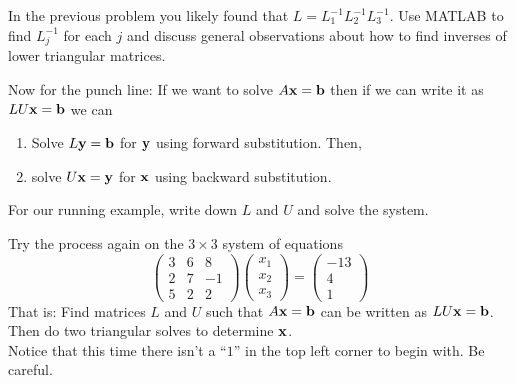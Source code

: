\begin{problem}
    In the previous problem you likely found that $L = L_1^{-1} L_2^{-1} L_3^{-1}$.  Use
    MATLAB to find $L_j^{-1}$ for each $j$ and discuss general observations about how to
    find inverses of lower triangular matrices.  
\end{problem}

\begin{problem}
    Now for the punch line: If we want to solve $A {\bf x} = {\bf b}$ then if we can write it as $LU
    {\bf x} = {\bf b}$ we can
    \begin{enumerate}
        \item Solve $L {\bf y} = {\bf b}$ for ${\bf y}$ using forward substitution.  Then,
        \item solve $U {\bf x} = {\bf y}$ for ${\bf x}$ using backward substitution.
    \end{enumerate}
    For our running example, write down $L$ and $U$ and solve the system.
\end{problem}

\begin{problem}
    Try the process again on the $3\times 3$ system of equations
    \[ \begin{pmatrix}
        3 & 6 & 8\\
        2 & 7 & -1 \\
        5 & 2 & 2 
    \end{pmatrix} \begin{pmatrix} x_1 \\ x_2 \\ x_3 \end{pmatrix} = 
        \begin{pmatrix} -13 \\ 4 \\ 1 \end{pmatrix} \]
    That is: Find matrices $L$ and $U$ such that $A {\bf x} = {\bf b}$ can be written as $LU{\bf x} =
    {\bf b}$.  Then do two triangular solves to determine ${\bf x}$.\\
    Notice that this time there isn't a ``$1$'' in the top left corner to begin with.  Be
    careful.
\end{problem}


